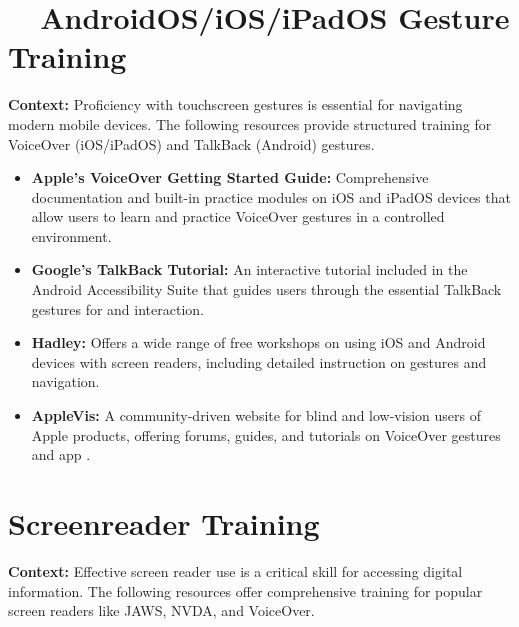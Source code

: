 \section{~~AndroidOS/iOS/iPadOS Gesture Training}\label{app4:gesture-training}

\noindent
\textbf{Context:} Proficiency with touchscreen gestures is essential for navigating modern mobile devices. The following resources provide structured training for VoiceOver (iOS/iPadOS) and TalkBack (Android) gestures.

\begin{itemize}
	\item \textbf{Apple's VoiceOver Getting Started Guide:} Comprehensive documentation and built-in practice modules on iOS and iPadOS devices that allow users to learn and practice VoiceOver gestures in a controlled environment.
	\item \textbf{Google's TalkBack Tutorial:} An interactive tutorial included in the Android Accessibility Suite that guides users through the essential TalkBack gestures for  and interaction.
	\item \textbf{Hadley:} Offers a wide range of free workshops on using iOS and Android devices with screen readers, including detailed instruction on gestures and navigation.
	\item \textbf{AppleVis:} A community-driven website for blind and low-vision users of Apple products, offering forums, guides, and tutorials on VoiceOver gestures and app .
\end{itemize}

\section[Screenreader Training]{Screenreader Training}\label{app4:screenreader-training}

\noindent
\textbf{Context:} Effective screen reader use is a critical skill for accessing digital information. The following resources offer comprehensive training for popular screen readers like JAWS, NVDA, and VoiceOver.

